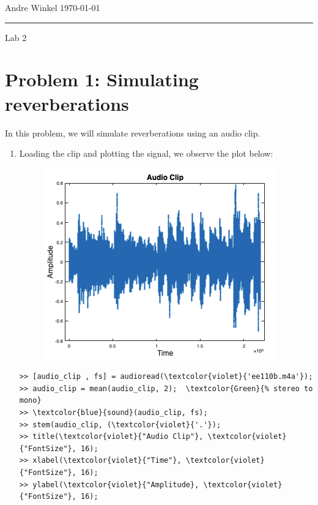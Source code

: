 \documentclass[12pt]{article}
\begin{document}
\noindent Andre Winkel \hfill \today \\
\rule{\textwidth}{0.4pt} \vspace{0em}
\begin{center} \large{Lab 2} \end{center} \vspace*{0em}

\section*{Problem 1: Simulating reverberations}
In this problem, we will simulate reverberations using an audio clip.
\begin{enumerate}[label=\textbf{\alph*)}, leftmargin=2.6em]

\item Loading the clip and plotting the signal, we observe the plot below:
\begin{figure}[H]
    \centering
    \includegraphics[width=0.5\linewidth]{plot1.png}
\end{figure}
\begin{Verbatim}[frame=single, commandchars=\\\{\}]
>> [audio_clip , fs] = audioread(\textcolor{violet}{'ee110b.m4a'});
>> audio_clip = mean(audio_clip, 2);  \textcolor{Green}{% stereo to mono}
>> \textcolor{blue}{sound}(audio_clip, fs);
>> stem(audio_clip, (\textcolor{violet}{'.'});
>> title(\textcolor{violet}{"Audio Clip"}, \textcolor{violet}{"FontSize"}, 16);
>> xlabel(\textcolor{violet}{"Time"}, \textcolor{violet}{"FontSize"}, 16);
>> ylabel(\textcolor{violet}{"Amplitude}, \textcolor{violet}{"FontSize"}, 16);
\end{Verbatim}


\end{enumerate}
\end{document}
